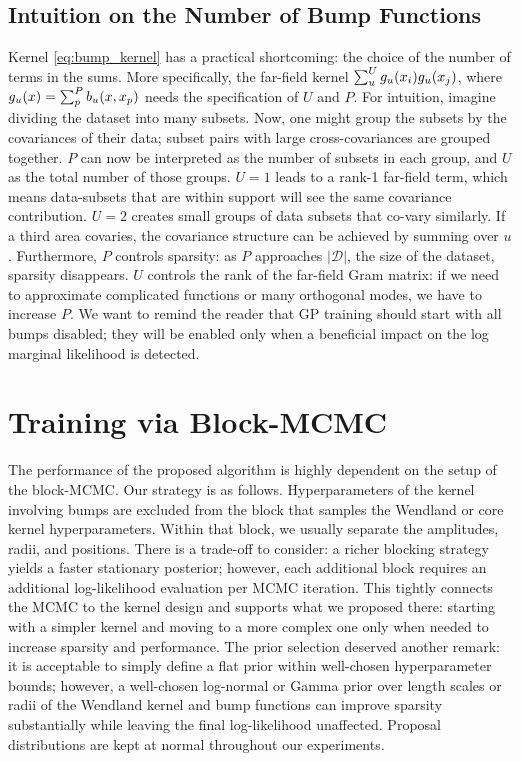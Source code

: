 \documentclass{article}
\renewcommand{\mathbf}[1]{%
  \ifx#1x x\else \textbf{#1}\fi
}
\begin{document}
\subsection{Intuition on the Number of Bump Functions} \label{A:number_of_bumps}
Kernel \eqref{eq:bump_kernel} has a practical shortcoming: the choice of the number of terms in the sums. More specifically,
the far-field kernel $\sum_u^U g_u(\mathbf{x}_i) g_u(\mathbf{x}_j)$, where $g_u(\mathbf{x})=\sum_p^P b_u(\mathbf{x}, \mathbf{x}_{p})$ needs the specification of $U$ and $P$. For intuition, imagine dividing the dataset into many subsets. Now, one might group the subsets by the covariances of their data; subset pairs with large cross-covariances are grouped together. $P$ can now be interpreted as the number of subsets in each group, and $U$ as the total number of those groups. $U=1$ leads to a rank-1 far-field term, which means data-subsets that are within support will see the same covariance contribution. $U=2$ creates small groups of data subsets that co-vary similarly. If a third area covaries, the covariance structure can be achieved by summing over $u$. Furthermore, $P$ controls sparsity: as $P$ approaches $|\mathcal{D}|$, the size of the dataset, sparsity disappears. $U$ controls the rank of the far-field Gram matrix: if we need to approximate complicated functions or many orthogonal modes, we have to increase $P$. We want to remind the reader that GP training should start with all bumps disabled; they will be enabled only when a beneficial impact on the log marginal likelihood is detected.

\section{Training via Block-MCMC}
The performance of the proposed algorithm is highly dependent on the setup of the block-MCMC. Our strategy is as follows. Hyperparameters of the kernel involving bumps are excluded from the block that samples the Wendland or core kernel hyperparameters. Within that block, we usually separate the amplitudes, radii, and positions. There is a trade-off to consider: a richer blocking strategy yields a faster stationary posterior; however, each additional block requires an additional log-likelihood evaluation per MCMC iteration. This tightly connects the MCMC to the kernel design and supports what we proposed there: starting with a simpler kernel and moving to a more complex one only when needed to increase sparsity and performance. The prior selection deserved another remark: it is acceptable to simply define a flat prior within well-chosen hyperparameter bounds; however, a well-chosen log-normal or Gamma prior over length scales or radii of the Wendland kernel and bump functions can improve sparsity substantially while leaving the final log-likelihood unaffected. Proposal distributions are kept at normal throughout our experiments.
\end{document}
